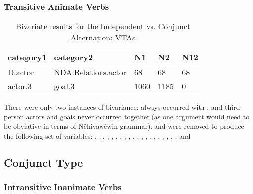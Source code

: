 \FloatBarrier
\FloatBarrier

\subsubsection{Transitive Animate Verbs}

\begin{table}[H]
\centering
\begin{tabular}{lllll}
\toprule
category1        & category2  & N1   & N2   & N12 \\
\midrule
D.actor & NDA.Relations.actor & 68 & 68 & 68 \\
actor.3 & goal.3 & 1060 & 1185 & 0 \\
\bottomrule
\end{tabular}
\caption{
   Bivariate results for the Independent vs. Conjunct Alternation: VTAs \\ \label{tab:tacnjuni}
  }
\end{table}
\FloatBarrier
\FloatBarrier
There were only two instances of bivariance:  always occurred with , and third person actors and goals never occurred together (as one argument would need to be obviative in terms of Nêhiyawêwin grammar).  and  were removed to produce the following set of variables: , , , , , , , , , , , , , , , , , , , , and 



\subsection{Conjunct Type}

\FloatBarrier

\subsubsection{Intransitive Inanimate Verbs}

